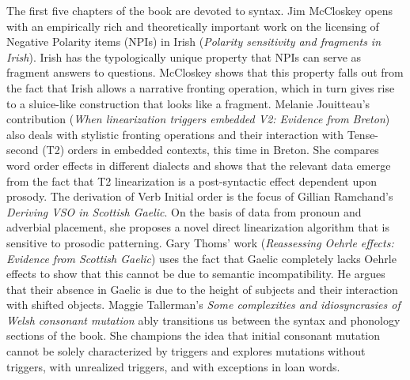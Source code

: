 \documentclass[output=paper]{langsci/langscibook}
\begin{document}
The first five chapters of the book are devoted to syntax. Jim McCloskey opens with an empirically rich and theoretically important work on the licensing of Negative Polarity items (NPIs) in Irish (\textit{Polarity sensitivity and fragments in Irish}). Irish has the typologically unique property that NPIs can serve as fragment answers to questions. McCloskey shows that this property falls out from the fact that Irish allows a narrative fronting operation, which in turn gives rise to a sluice-like construction that looks like a fragment. Melanie Jouitteau’s contribution (\textit{When linearization triggers embedded V2: Evidence from Breton}) also deals with stylistic fronting operations and their interaction with Tense-second (T2) orders in embedded contexts, this time in Breton. She compares word order effects in different dialects and shows that the relevant data emerge from the fact that T2 linearization is a post-syntactic effect dependent upon prosody. The derivation of Verb Initial order is the focus of Gillian Ramchand’s \textit{Deriving VSO in Scottish Gaelic}. On the basis of data from pronoun and adverbial placement, she proposes a novel direct linearization algorithm that is sensitive to prosodic patterning. Gary Thoms’ work (\textit{Reassessing Oehrle effects: Evidence from Scottish Gaelic}) uses the fact that Gaelic completely lacks Oehrle effects to show that this cannot be due to semantic incompatibility. He argues that their absence in Gaelic is due to the height of subjects and their interaction with shifted objects. Maggie Tallerman’s \textit{Some complexities and idiosyncrasies of Welsh consonant mutation} ably transitions us between the syntax and phonology sections of the book. She champions the idea that initial consonant mutation cannot be solely characterized by triggers and explores mutations without triggers, with unrealized triggers, and with exceptions in loan words.
\end{document}
